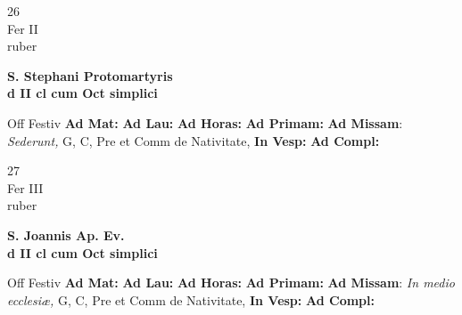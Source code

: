 \documentclass[10pt, openany]{book}
\begin{document}
    \begin{center}
        \begin{minipage}{3.5in}
            \vspace{2em}
            \begin{minipage}{0.5in}
                {\Huge 26} \\
                {\normalsize Fer II} \\
                {\normalsize ruber}
            \end{minipage}
            \begin{minipage}{3.0in}
                \textbf{ \large S. Stephani Protomartyris \\
                \textnormal{\normalsize d II cl cum Oct simplici}} \\ 
            \end{minipage}
            \begin{justify}Off Festiv
                \textbf{Ad Mat: }
                \textbf{Ad Lau: }
                \textbf{Ad Horas: }
                \textbf{Ad Primam: }\textbf{Ad Missam}: \textit{Sederunt,} G, C, Pre et Comm de Nativitate,  
                \textbf{In Vesp: }
                \textbf{Ad Compl: }
            \end{justify}
        \end{minipage}
    \end{center}

    \begin{center}
        \begin{minipage}{3.5in}
            \vspace{2em}
            \begin{minipage}{0.5in}
                {\Huge 27} \\
                {\normalsize Fer III} \\
                {\normalsize ruber}
            \end{minipage}
            \begin{minipage}{3.0in}
                \textbf{ \large S. Joannis Ap. Ev. \\
                \textnormal{\normalsize d II cl cum Oct simplici}} \\ 
            \end{minipage}
            \begin{justify}Off Festiv
                \textbf{Ad Mat: }
                \textbf{Ad Lau: }
                \textbf{Ad Horas: }
                \textbf{Ad Primam: }\textbf{Ad Missam}: \textit{In medio ecclesiæ,} G, C, Pre et Comm de Nativitate,  
                \textbf{In Vesp: }
                \textbf{Ad Compl: }
            \end{justify}
        \end{minipage}
    \end{center}
\end{document}
